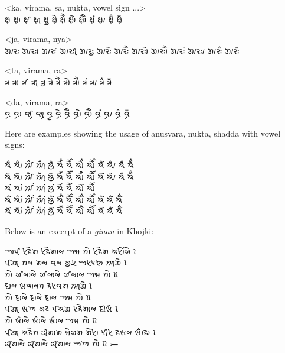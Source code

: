 \documentclass[12pt]{article}
\begin{document}
<ka, virama, sa, nukta, vowel sign ...> \\
{\Large\khoj 
𑈈𑈵𑈩𑈶 𑈈𑈵𑈩𑈶𑈬 𑈈𑈵𑈩𑈶𑈭 𑈈𑈵𑈩𑈶𑈮 𑈈𑈵𑈩𑈶𑈯 𑈈𑈵𑈩𑈶𑈰 𑈈𑈵𑈩𑈶𑈱 𑈈𑈵𑈩𑈶𑈲 𑈈𑈵𑈩𑈶𑈳 𑈈𑈵𑈩𑈶𑈴 𑈈𑈵𑈩𑈶𑈵 𑈈𑈵𑈩𑈶𑈶 𑈈𑈵𑈩𑈶𑈷 \\
}

<ja, virama, nya> \\
{\Large\khoj 
𑈐𑈵𑈓 𑈐𑈵𑈓𑈬 𑈐𑈵𑈓𑈭 𑈐𑈵𑈓𑈮 𑈐𑈵𑈓𑈯 𑈐𑈵𑈓𑈰 𑈐𑈵𑈓𑈱 𑈐𑈵𑈓𑈲 𑈐𑈵𑈓𑈳 𑈐𑈵𑈓𑈴 𑈐𑈵𑈓𑈵 𑈐𑈵𑈓𑈶 𑈐𑈵𑈓𑈷 \\
}

<ta, virama, ra> \\
{\Large\khoj 
𑈙𑈵𑈦 𑈙𑈵𑈦𑈬 𑈙𑈵𑈦𑈭 𑈙𑈵𑈦𑈮 𑈙𑈵𑈦𑈯 𑈙𑈵𑈦𑈰 𑈙𑈵𑈦𑈱 𑈙𑈵𑈦𑈲 𑈙𑈵𑈦𑈳 𑈙𑈵𑈦𑈴 𑈙𑈵𑈦𑈵 𑈙𑈵𑈦𑈶 𑈙𑈵𑈦𑈷 \\ 
}

<da, virama, ra> \\
{\Large\khoj 
𑈛𑈵𑈦 𑈛𑈵𑈦𑈬 𑈛𑈵𑈦𑈭 𑈛𑈵𑈦𑈮 𑈛𑈵𑈦𑈯 𑈛𑈵𑈦𑈰 𑈛𑈵𑈦𑈱 𑈛𑈵𑈦𑈲 𑈛𑈵𑈦𑈳 𑈛𑈵𑈦𑈴 𑈛𑈵𑈦𑈵 𑈛𑈵𑈦𑈶 𑈛𑈵𑈦𑈷 \\ 
}
\bigskip

Here are examples showing the usage of anusvara, nukta, shadda 
with vowel signs:
\bigskip

{\Large\khoj 
𑈈𑈶 𑈈𑈶𑈬 𑈈𑈶𑈭 𑈈𑈶𑈮 𑈈𑈶𑈯 𑈈𑈶𑈰 𑈈𑈶𑈱 𑈈𑈶𑈲 𑈈𑈶𑈳 𑈈𑈶𑈴 𑈈𑈶𑈵 𑈈𑈶𑈶 𑈈𑈶𑈷 \\

𑈈𑈷 𑈈𑈷𑈬 𑈈𑈷𑈭 𑈈𑈷𑈮 𑈈𑈷𑈯 𑈈𑈷𑈰 𑈈𑈷𑈱 𑈈𑈷𑈲 𑈈𑈷𑈳 𑈈𑈷𑈴 𑈈𑈷𑈵 𑈈𑈷𑈶 𑈈𑈶𑈷 \\

𑈈𑈴 𑈈𑈬𑈴 𑈈𑈭𑈴 𑈈𑈮𑈴 𑈈𑈯𑈴 𑈈𑈰𑈴 𑈈𑈱𑈴 𑈈𑈲𑈴 𑈈𑈳𑈴 \\

𑈈𑈶𑈴 𑈈𑈶𑈬𑈴 𑈈𑈶𑈭𑈴 𑈈𑈶𑈮𑈴 𑈈𑈶𑈯𑈴 𑈈𑈶𑈰𑈴 𑈈𑈶𑈱𑈴 𑈈𑈶𑈲𑈴 𑈈𑈶𑈳𑈴 𑈈𑈶𑈴 𑈈𑈶𑈶𑈴 𑈈𑈶𑈷𑈴 \\

𑈈𑈷𑈴 𑈈𑈷𑈬𑈴 𑈈𑈷𑈭𑈴 𑈈𑈷𑈮𑈴 𑈈𑈷𑈯𑈴 𑈈𑈷𑈰𑈴 𑈈𑈷𑈱𑈴 𑈈𑈷𑈲𑈴 𑈈𑈷𑈳𑈴 𑈈𑈷𑈴 𑈈𑈷𑈶𑈴 𑈈𑈶𑈷𑈴 \\
}
\bigskip

Below is an excerpt of a \textit{ginan} in Khojki: 
\bigskip

{\large\khoj 
𑈁𑈄 𑈦𑈪𑈰𑈤 𑈦𑈪𑈰𑈤𑈬𑈞 𑈀𑈢 𑈙𑈲 𑈦𑈪𑈰𑈤 𑈈𑈦𑈲𑈴𑈊𑈰 𑈸 \\
𑈄𑈐𑈮 𑈙𑈞 𑈤𑈞 𑈛𑈞 𑈊𑈯𑈦𑈯 𑈀𑈦𑈟𑈘 𑈈𑈮𑈐𑈰 𑈸 \\
𑈙𑈲 𑈊𑈭𑈞𑈬𑈞𑈰 𑈊𑈭𑈞𑈬𑈞𑈰 𑈊𑈭𑈞𑈬𑈞 𑈀𑈢 𑈙𑈲 𑈹 \\
𑈜𑈬𑈞 𑈩𑈉𑈬𑈨𑈙 𑈪𑈦𑈛𑈤 𑈈𑈮𑈐𑈰 𑈸 \\
𑈙𑈲 𑈜𑈬𑈞𑈰 𑈜𑈬𑈞𑈰 𑈜𑈬𑈞 𑈀𑈢 𑈙𑈲 𑈹 \\
𑈄𑈐𑈮 𑈩𑈡 𑈊𑈔 𑈄𑈈𑈐 𑈦𑈪𑈰𑈤𑈬𑈞 𑈜𑈮𑈩𑈰 𑈸 \\ 
𑈙𑈲 𑈩𑈶𑈬𑈞𑈰 𑈩𑈶𑈬𑈞𑈰 𑈩𑈶𑈬𑈞 𑈀𑈢 𑈙𑈲 𑈹 \\
𑈄𑈐𑈮 𑈈𑈪𑈰𑈙 𑈂𑈤𑈬𑈤 𑈢𑈰𑈊𑈤 𑈤𑈰𑈦𑈬 𑈟𑈮𑈦 𑈪𑈩𑈞 𑈩𑈶𑈬𑈪𑈬 𑈸 \\
𑈂𑈤𑈬𑈞𑈰 𑈂𑈤𑈬𑈞𑈰 𑈂𑈤𑈬𑈞 𑈀𑈡 𑈙𑈲 𑈹 𑈼 \\
}
\end{document}
